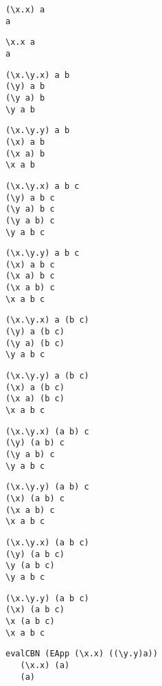 \documentclass{article}
\theoremstyle{theorem}
\theoremstyle{definition}
\theoremstyle{remark}
\begin{document}
\begin{lstlisting}
(\x.x) a
a
\end{lstlisting}
%

\begin{lstlisting}
\x.x a
a
\end{lstlisting}
%

\begin{lstlisting}
(\x.\y.x) a b
(\y) a b
(\y a) b
\y a b
\end{lstlisting}
%

\begin{lstlisting}
(\x.\y.y) a b
(\x) a b
(\x a) b
\x a b
\end{lstlisting}
%

\begin{lstlisting}
(\x.\y.x) a b c
(\y) a b c
(\y a) b c
(\y a b) c
\y a b c
\end{lstlisting}
%

\begin{lstlisting}
(\x.\y.y) a b c
(\x) a b c
(\x a) b c
(\x a b) c
\x a b c
\end{lstlisting}
%

\begin{lstlisting}
(\x.\y.x) a (b c)
(\y) a (b c)
(\y a) (b c)
\y a b c
\end{lstlisting}
%

\begin{lstlisting}
(\x.\y.y) a (b c)
(\x) a (b c)
(\x a) (b c)
\x a b c
\end{lstlisting}
%

\begin{lstlisting}
(\x.\y.x) (a b) c
(\y) (a b) c
(\y a b) c
\y a b c
\end{lstlisting}
%

\begin{lstlisting}
(\x.\y.y) (a b) c
(\x) (a b) c
(\x a b) c
\x a b c
\end{lstlisting}
%

\begin{lstlisting}
(\x.\y.x) (a b c)
(\y) (a b c)
\y (a b c)
\y a b c
\end{lstlisting}
%

\begin{lstlisting}
(\x.\y.y) (a b c)
(\x) (a b c)
\x (a b c)
\x a b c
\end{lstlisting}
%

\begin{lstlisting}
evalCBN (EApp (\x.x) ((\y.y)a))
   (\x.x) (a)
   (a)
\end{lstlisting}
%
\end{document}
